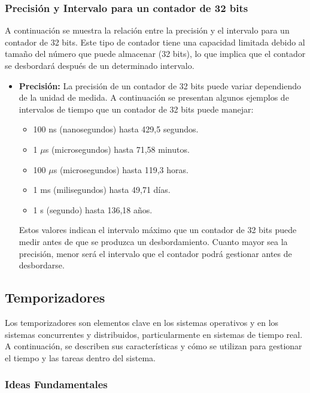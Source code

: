 \documentclass[a4paper,12pt]{article}
\begin{document}
\subsubsection{Precisión y Intervalo para un contador de 32 bits}

A continuación se muestra la relación entre la precisión y el intervalo para un contador de 32 bits. Este tipo de contador tiene una capacidad limitada debido al tamaño del número que puede almacenar (32 bits), lo que implica que el contador se desbordará después de un determinado intervalo.

\begin{itemize}
    \item \textbf{Precisión:} La precisión de un contador de 32 bits puede variar dependiendo de la unidad de medida. A continuación se presentan algunos ejemplos de intervalos de tiempo que un contador de 32 bits puede manejar:
    \begin{itemize}
        \item 100 ns (nanosegundos) hasta 429,5 segundos.
        \item 1 \(\mu\)s (microsegundos) hasta 71,58 minutos.
        \item 100 \(\mu\)s (microsegundos) hasta 119,3 horas.
        \item 1 ms (milisegundos) hasta 49,71 días.
        \item 1 s (segundo) hasta 136,18 años.
    \end{itemize}
    
    Estos valores indican el intervalo máximo que un contador de 32 bits puede medir antes de que se produzca un desbordamiento. Cuanto mayor sea la precisión, menor será el intervalo que el contador podrá gestionar antes de desbordarse.
\end{itemize}





\subsection{Temporizadores}

Los temporizadores son elementos clave en los sistemas operativos y en los sistemas concurrentes y distribuidos, particularmente en sistemas de tiempo real. A continuación, se describen sus características y cómo se utilizan para gestionar el tiempo y las tareas dentro del sistema.

\subsubsection{Ideas Fundamentales}
\end{document}
